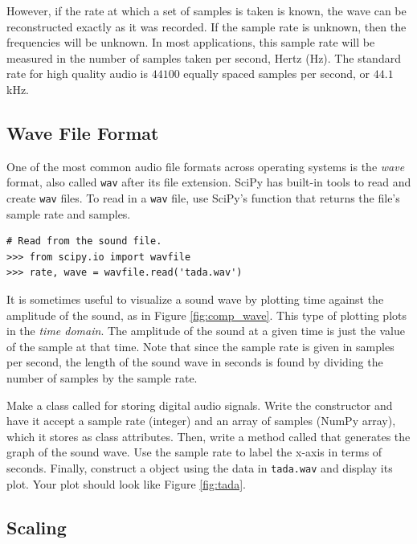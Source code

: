 However, if the rate at which a set of samples is taken is known, the wave can be reconstructed exactly as it was recorded.
If the sample rate is unknown, then the frequencies will be unknown.
In most applications, this sample rate will be measured in the number of samples taken per second, Hertz (Hz).
The standard rate for high quality audio is $44100$ equally spaced samples per second, or $44.1$ kHz.

\subsection*{Wave File Format} %

One of the most common audio file formats across operating systems is the \emph{wave} format, also called \texttt{wav} after its file extension.
SciPy has built-in tools to read and create \texttt{wav} files.
To read in a \texttt{wav} file, use SciPy's  function that returns the file's sample rate and samples.

\begin{lstlisting}
# Read from the sound file.
>>> from scipy.io import wavfile
>>> rate, wave = wavfile.read('tada.wav')
\end{lstlisting}

It is sometimes useful to visualize a sound wave by plotting time against the amplitude of the sound, as in Figure \ref{fig:comp_wave}.
This type of plotting plots in the \emph{time domain}.
The amplitude of the sound at a given time is just the value of the sample at that time.
Note that since the sample rate is given in samples per second, the length of the sound wave in seconds is found by dividing the number of samples by the sample rate.

\begin{problem}
Make a class called  for storing digital audio signals.
Write the constructor and have it accept a sample rate (integer) and an array of samples (NumPy array), which it stores as class attributes.
Then, write a method called  that generates the graph of the sound wave.
Use the sample rate to label the x-axis in terms of seconds.
Finally, construct a  object using the data in \texttt{tada.wav} and display its plot.
Your plot should look like Figure \ref{fig:tada}.
\end{problem}

\subsection*{Scaling} %

